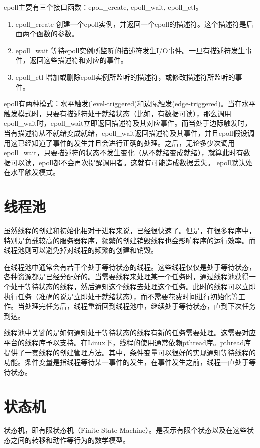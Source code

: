 \documentclass[12pt, twoside, a4paper, xetex]{report}
\begin{document}
	epoll主要有三个接口函数：epoll\_create, epoll\_wait, epoll\_ctl。
	\begin{enumerate}
		\item epoll\_create 创建一个epoll实例，并返回一个epoll的描述符。这个描述符是后面两个函数的参数。
		\item epoll\_wait 等待epoll实例所监听的描述符发生I/O事件。一旦有描述符发生事件，返回这些描述符和对应的事件。
		\item epoll\_ctl 增加或删除epoll实例所监听的描述符，或修改描述符所监听的事件。
	\end{enumerate}
	
	epoll有两种模式：水平触发(level-triggered)和边际触发(edge-triggered)。当在水平触发模式时，只要有描述符处于就绪状态（比如，有数据可读），那么调用epoll\_wait时，epoll\_wait立即返回描述符及其对应事件。而当处于边际触发时，当有描述符从不就绪变成就绪，epoll\_wait返回描述符及其事件，并且epoll假设调用这已经知道了事件的发生并且会进行正确的处理。之后，无论多少次调用epoll\_wait，只要描述符的状态不发生变化（从不就绪变成就绪），就算此时有数据可以读，epoll都不会再次提醒调用者。这就有可能造成数据丢失。
	epoll默认处在水平触发模式。
	
\section{线程池}
	虽然线程的创建和初始化相对于进程来说，已经很快速了。但是，在很多程序中，特别是负载较高的服务器程序，频繁的创建销毁线程也会影响程序的运行效率。而线程池则可以避免掉对线程的频繁的创建和销毁。
	
	在线程池中通常会有若干个处于等待状态的线程。这些线程仅仅是处于等待状态，各种资源都是已经分配好的。当需要线程来处理某一个任务时，通过线程池获得一个处于等待状态的线程，然后通知这个线程去处理这个任务。此时的线程可以立即执行任务（准确的说是立即处于就绪状态），而不需要花费时间进行初始化等工作。当处理完任务后，线程重新回到线程池中，继续处于等待状态，直到下次任务到达。
	
	线程池中关键的是如何通知处于等待状态的线程有新的任务需要处理。这需要对应平台的线程库予以支持。在Linux下，线程的使用通常依赖pthread库。pthread库提供了一套线程的创建管理方法。其中，条件变量可以很好的实现通知等待线程的功能。条件变量是指线程等待某一事件的发生，在事件发生之前，线程一直处于等待状态。

\section{状态机}
	状态机，即有限状态机（Finite State Machine）。是表示有限个状态以及在这些状态之间的转移和动作等行为的数学模型。
	
\end{document}
